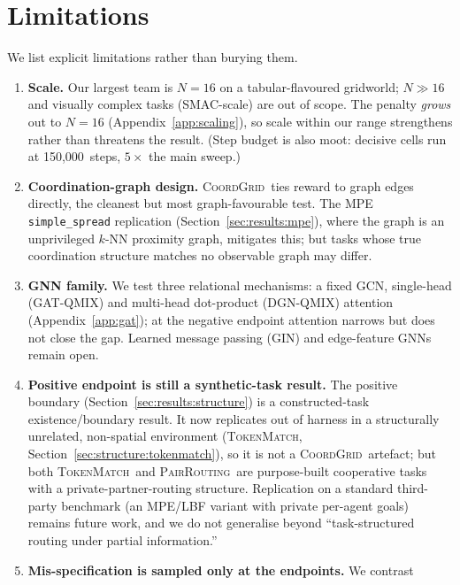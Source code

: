 \documentclass[manuscript, screen, review]{jair}
\newcommand{\algoname}[1]{\textsc{#1}}
\newcommand{\coordgrid}{\textsc{CoordGrid}}
\newcommand{\gatqmix}{\algoname{GAT-QMIX}}
\newcommand{\dgnqmix}{\algoname{DGN-QMIX}}
\newcommand{\PEsteps}{150{,}000}      %
\newcommand{\pairrouting}{\textsc{PairRouting}}
\newcommand{\tokenmatch}{\textsc{TokenMatch}}
\begin{document}
\section{Limitations}
\label{sec:limitations}

We list explicit limitations rather than burying them.
\begin{enumerate}[leftmargin=*,itemsep=0pt,topsep=2pt]
  \item \textbf{Scale.} Our largest team is $N{=}16$ on a tabular-flavoured
        gridworld; $N{\gg}16$ and visually complex tasks (SMAC-scale) are
        out of scope. The penalty \emph{grows} out to $N{=}16$
        (Appendix~\ref{app:scaling}), so scale within our range strengthens
        rather than threatens the result. (Step budget is also moot:
        decisive cells run at \PEsteps\ steps, $5\times$ the main sweep.)
  \item \textbf{Coordination-graph design.} \coordgrid\ ties reward to
        graph edges directly, the cleanest but most graph-favourable
        test. The MPE \texttt{simple\_spread} replication
        (Section~\ref{sec:results:mpe}), where the graph is an unprivileged
        $k$-NN proximity graph, mitigates this; but tasks whose true
        coordination structure matches no observable graph may differ.
  \item \textbf{GNN family.} We test three relational mechanisms: a fixed
        GCN, single-head (\gatqmix) and multi-head dot-product (\dgnqmix)
        attention (Appendix~\ref{app:gat}); at the negative endpoint
        attention narrows but does not close the gap. Learned message passing
        (\algoname{GIN}) and edge-feature GNNs remain open.
  \item \textbf{Positive endpoint is still a synthetic-task result.} The
        positive boundary (Section~\ref{sec:results:structure}) is a
        constructed-task existence/boundary result. It now replicates out of
        harness in a structurally unrelated, non-spatial environment
        (\tokenmatch, Section~\ref{sec:structure:tokenmatch}), so it is not a
        \coordgrid\ artefact; but both \tokenmatch\ and \pairrouting\ are
        purpose-built cooperative tasks with a private-partner-routing
        structure. Replication on a standard third-party benchmark (an MPE/LBF
        variant with private per-agent goals) remains future work, and we do
        not generalise beyond ``task-structured routing under partial
        information.''
  \item \textbf{Mis-specification is sampled only at the endpoints.} We contrast

\end{enumerate}
\end{document}

